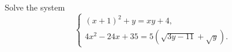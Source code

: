 Solve the system
\[\begin{cases}(x+1)^2+y=xy+4,\\[2pt]4x^2-24x+35=5\left(\sqrt{3y-11}+\sqrt y\right).\end{cases}\]
